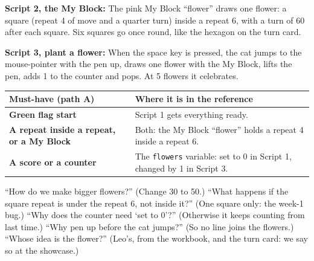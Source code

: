 \documentclass[track=junior,level=3,teacher]{kidscode}
\newenvironment{refscript}[2]{\par\needspace{8\baselineskip}\noindent\textbf{\color{kcaccent}#1:} #2\par\smallskip\begin{center}\begin{scratch}[scale=0.8]}{\end{scratch}\end{center}}
\begin{document}
\begin{refscript}{Script 2, the My Block}{The pink My Block \enquote{flower} draws one flower: a square (repeat 4 of move and a quarter turn) inside a repeat 6, with a turn of 60 after each square. Six squares go once round, like the hexagon on the turn card.}
\end{refscript}

\begin{refscript}{Script 3, plant a flower}{When the space key is pressed, the cat jumps to the mouse-pointer with the pen up, draws one flower with the My Block, lifts the pen, adds 1 to the counter and pops. At 5 flowers it celebrates.}
\end{refscript}

\begin{center}\small\renewcommand{\arraystretch}{1.3}
\begin{tabularx}{\linewidth}{@{}>{\bfseries}p{4.6cm}X@{}}
\toprule
Must-have (path A) & Where it is in the reference\\
\midrule
Green flag start & Script 1 gets everything ready.\\
A repeat inside a repeat, or a My Block & Both: the My Block \enquote{flower} holds a repeat 4 inside a repeat 6.\\
A score or a counter & The \texttt{flowers} variable: set to 0 in Script 1, changed by 1 in Script 3.\\
\bottomrule
\end{tabularx}
\end{center}

\begin{tip}
\enquote{How do we make bigger flowers?} (Change 30 to 50.)
\enquote{What happens if the square repeat is under the repeat 6, not inside it?} (One square only: the week-1 bug.)
\enquote{Why does the counter need \enquote{set to 0}?} (Otherwise it keeps counting from last time.)
\enquote{Why pen up before the cat jumps?} (So no line joins the flowers.)
\enquote{Whose idea is the flower?} (Leo's, from the workbook, and the turn card: we say so at the showcase.)
\end{tip}
\end{document}
